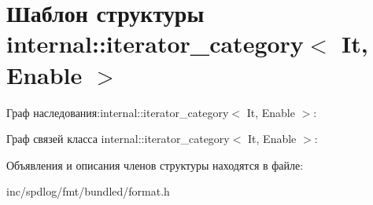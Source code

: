 \hypertarget{structinternal_1_1iterator__category}{}\section{Шаблон структуры internal\+:\+:iterator\+\_\+category$<$ It, Enable $>$}
\label{structinternal_1_1iterator__category}


Граф наследования\+:internal\+:\+:iterator\+\_\+category$<$ It, Enable $>$\+:


Граф связей класса internal\+:\+:iterator\+\_\+category$<$ It, Enable $>$\+:


Объявления и описания членов структуры находятся в файле\+:\begin{DoxyCompactItemize}
\item 
inc/spdlog/fmt/bundled/format.\+h\end{DoxyCompactItemize}
